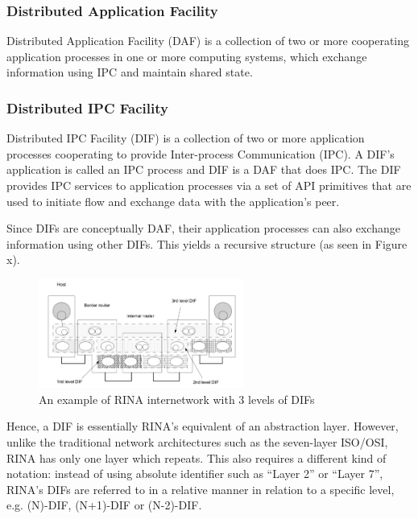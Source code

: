             \subsubsection{Distributed Application Facility}

                Distributed Application Facility (DAF) is a collection of two or more cooperating application processes in one or more computing systems, which exchange information using IPC and maintain shared state.

            \subsubsection{Distributed IPC Facility}

                Distributed IPC Facility (DIF) is a collection of two or more application processes cooperating to provide Inter-process Communication (IPC). A DIF's application is called an IPC process and DIF is a DAF that does IPC. The DIF provides IPC services to application processes via a set of API primitives that are used to initiate flow and exchange data with the application's peer.

                Since DIFs are conceptually DAF, their application processes can also exchange information using other DIFs. This yields a recursive structure (as seen in Figure x).

                \begin{figure}[H]
                    \begin{center}
                        \includegraphics[width=0.6\textwidth]{fig/archs_rina-net.png}
                      \caption{An example of RINA internetwork with 3 levels of DIFs}
                      \label{fig:rina_network}
                    \end{center}
                \end{figure}

                Hence, a DIF is essentially RINA's equivalent of an abstraction layer. However, unlike the traditional network architectures such as the seven-layer ISO/OSI, RINA has only one layer which repeats. This also requires a different kind of notation: instead of using absolute identifier such as ``Layer 2'' or ``Layer 7'', RINA's DIFs are referred to in a relative manner in relation to a specific level, e.g. (N)-DIF, (N+1)-DIF or (N-2)-DIF.

